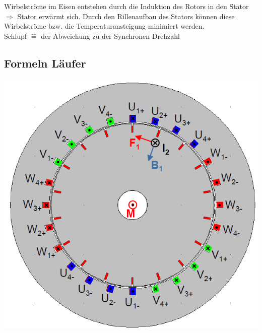     \\ \\
    Wirbelströme im Eisen entstehen durch die Induktion des Rotors in den Stator \newline
    $\Rightarrow$ Stator erwärmt sich.\newline
    Durch den Rillenaufbau des Stators können diese Wirbelströme bzw. die Temperaturansteigung minimiert werden.
    \\
    Schlupf $\widehat{=}$ der Abweichung zu der Synchronen Drehzahl 
    \clearpage
    \pagebreak

\subsection{Formeln Läufer}
    \includegraphics[scale = 0.4]{images/QuerschnittAmotor}
    \\ \\
